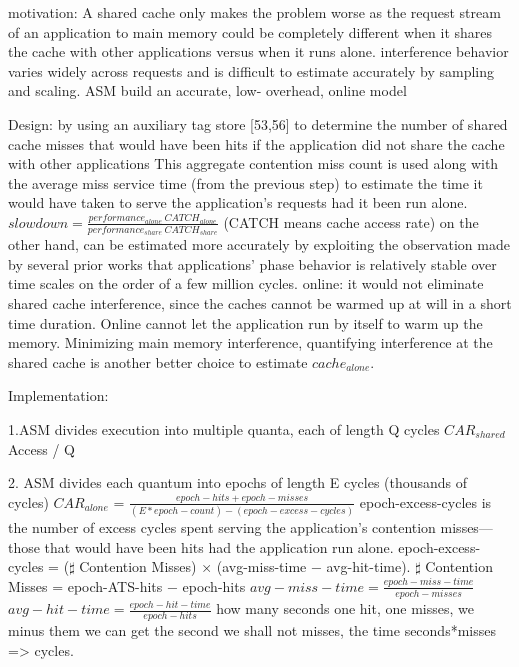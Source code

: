 \documentclass[8pt,UTF8]{article}
\begin{document}
                motivation: A shared cache only makes the problem worse as the request stream of an application to main memory could be completely different when it shares the cache with other applications versus when it runs alone. interference behavior varies widely across requests and is difficult to estimate accurately by sampling and scaling. ASM build an accurate, low- overhead, online model
                
                Design: by using an auxiliary tag store [53,56] to determine the number of shared cache misses that would have been hits if the application did not share the cache with other applications This aggregate contention miss count is used along with the average miss service time (from the previous step) to estimate the time it would have taken to serve the application’s requests had it been run alone.   $slowdown = \frac{performance_{alone} ~ CATCH_{alone}}{performance_{share} ~ CATCH_{share}}$ (CATCH means cache access rate) on the other hand, can be estimated more accurately by exploiting the observation made by several prior works that applications’ phase behavior is relatively stable over time scales on the order of a few million cycles.   online: it would not eliminate shared cache interference, since the caches cannot be warmed up at will in a short time duration.  Online cannot let the application run by itself to warm up the memory. Minimizing main memory interference, quantifying interference at the shared cache is another better choice to estimate $cache_{alone}$. 
                
                Implementation: 
                
                1.ASM divides execution into multiple quanta, each of length Q cycles $ CAR_{shared}$ Access / Q 
                
                2. ASM divides each quantum into epochs of length E cycles (thousands of cycles)  $CAR_{alone}$   = $\frac{epoch-hits + epoch-misses}{(E*epoch-count) - (epoch-excess-cycles)}$   epoch-excess-cycles is the number of excess cycles spent serving the application’s contention misses—those that would have been hits had the application run alone.  epoch-excess-cycles = ($\sharp$ Contention Misses) × (avg-miss-time − avg-hit-time). $\sharp$ Contention Misses = epoch-ATS-hits − epoch-hits $avg-miss-time = \frac{epoch-miss-time}{epoch-misses}$ $avg-hit-time = \frac{epoch-hit-time}{epoch-hits}$ how many seconds one hit, one misses, we minus them we can get the second we shall not misses, the time seconds*misses => cycles. 
                
\end{document}
